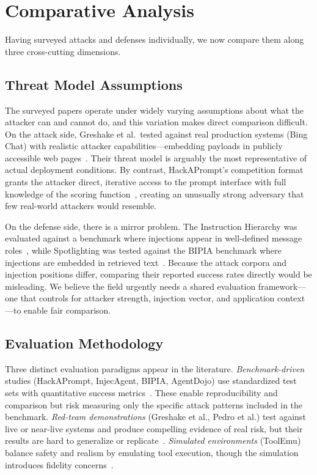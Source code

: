\section{Comparative Analysis}
\label{sec:comparison}

Having surveyed attacks and defenses individually, we now compare them along three cross-cutting dimensions.

\subsection{Threat Model Assumptions}

The surveyed papers operate under widely varying assumptions about what the attacker can and cannot do, and this variation makes direct comparison difficult. On the attack side, Greshake et al.\ tested against real production systems (Bing Chat) with realistic attacker capabilities---embedding payloads in publicly accessible web pages~\cite{greshake2023indirect}. Their threat model is arguably the most representative of actual deployment conditions. By contrast, HackAPrompt's competition format grants the attacker direct, iterative access to the prompt interface with full knowledge of the scoring function~\cite{perez2022hackaprompt}, creating an unusually strong adversary that few real-world attackers would resemble.

On the defense side, there is a mirror problem. The Instruction Hierarchy was evaluated against a benchmark where injections appear in well-defined message roles~\cite{wallace2024hierarchy}, while Spotlighting was tested against the BIPIA benchmark where injections are embedded in retrieved text~\cite{hines2024spotlighting}. Because the attack corpora and injection positions differ, comparing their reported success rates directly would be misleading. We believe the field urgently needs a shared evaluation framework---one that controls for attacker strength, injection vector, and application context---to enable fair comparison.

\subsection{Evaluation Methodology}

Three distinct evaluation paradigms appear in the literature. \emph{Benchmark-driven} studies (HackAPrompt, InjecAgent, BIPIA, AgentDojo) use standardized test sets with quantitative success metrics~\cite{perez2022hackaprompt, zhan2024injecagent, yi2023bipia, debenedetti2024agentdojo}. These enable reproducibility and comparison but risk measuring only the specific attack patterns included in the benchmark. \emph{Red-team demonstrations} (Greshake et al., Pedro et al.) test against live or near-live systems and produce compelling evidence of real risk, but their results are hard to generalize or replicate~\cite{greshake2023indirect, pedro2023prompt}. \emph{Simulated environments} (ToolEmu) balance safety and realism by emulating tool execution, though the simulation introduces fidelity concerns~\cite{ruan2024toolemu}.

